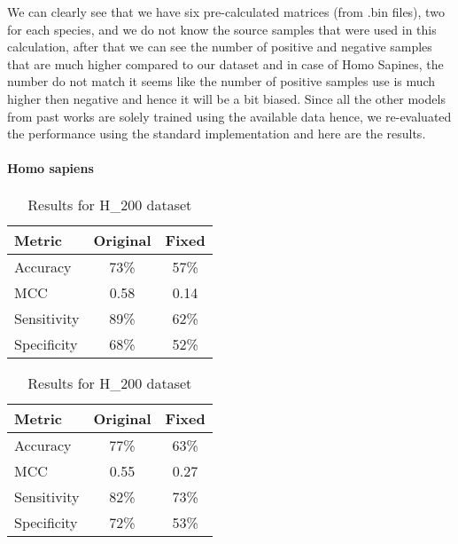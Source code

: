       We can clearly see that we have six pre-calculated matrices (from .bin files), two for each species, and we do not know the source samples that were used in this calculation, after that we can see the number of positive and negative samples that are much higher compared to our dataset and in case of Homo Sapines, the number do not match it seems like the number of positive samples use is much higher then negative and hence it will be a bit biased.
      Since all the other models from past works are solely trained using the available data hence, we re-evaluated the performance using the standard implementation and here are the results.

      \paragraph{Homo sapiens}
        \noindent
        \begin{table}[H]
            \centering
            \begin{minipage}{0.45\textwidth}
              \centering
              \begin{tabular}{lcc}
                \toprule
                \textbf{Metric} & \textbf{Original} & \textbf{Fixed} \\
                \midrule
                Accuracy        & 73\%              & 57\%           \\
                MCC             & 0.58              & 0.14           \\
                Sensitivity     & 89\%              & 62\%           \\
                Specificity     & 68\%              & 52\%           \\
                \bottomrule
              \end{tabular}
              \caption{Results for H\_990 dataset}
            \end{minipage}%
            \hfill
            \begin{minipage}{0.45\textwidth}
              \centering
              \begin{tabular}{lcc}
                \toprule
                \textbf{Metric} & \textbf{Original} & \textbf{Fixed} \\
                \midrule
                Accuracy        & 77\%              & 63\%           \\
                MCC             & 0.55              & 0.27           \\
                Sensitivity     & 82\%              & 73\%           \\
                Specificity     & 72\%              & 53\%           \\
                \bottomrule
              \end{tabular}
              \caption{Results for H\_200 dataset}
            \end{minipage}\label{tab:porpoise_pstnpss_hs}
        \end{table}

